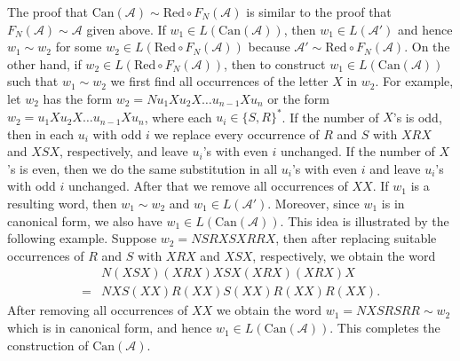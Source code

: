 \documentclass[fontsize=11pt,DIV=13,paper=letter]{scrartcl}
\theoremstyle{definition}
\newcommand{\A}{\mathcal{A}}
\begin{document}
The proof that $\mathrm{Can}(\A)\sim \mathrm{Red}\circ F_N(\A)$ is similar to the proof that $F_N(\A)\sim \A$ given above. If $w_1\in L(\mathrm{Can}(\A))$, then $w_1\in L(\A')$ and hence $w_1\sim w_2$ for some $w_2\in L(\mathrm{Red}\circ F_N(\A))$ because $\A'\sim \mathrm{Red}\circ F_N(\A)$. On the other hand, if $w_2\in L(\mathrm{Red}\circ F_N(\A))$, then to construct $w_1\in L(\mathrm{Can}(\A))$ such that $w_1\sim w_2$ we first find all occurrences of the letter $X$ in $w_2$. For example, let $w_2$ has the form $w_2=Nu_1Xu_2X\dots u_{n-1}Xu_n$ or the form $w_2=u_1Xu_2X\dots u_{n-1}Xu_n$, where each $u_i\in {\{S,R\}}^*$. If the number of $X$'s is odd, then in each $u_i$ with odd $i$ we replace every occurrence of $R$ and $S$ with $\mathit{XRX}$ and $\mathit{XSX}$, respectively, and leave $u_i$'s with even $i$ unchanged. If the number of $X$'s is even, then we do the same substitution in all $u_i$'s with even $i$ and leave $u_i$'s with odd $i$ unchanged. After that we remove all occurrences of $\mathit{XX}$. If $w_1$ is a resulting word, then $w_1\sim w_2$ and $w_1\in L(\A')$. Moreover, since $w_1$ is in canonical form, we also have $w_1\in L(\mathrm{Can}(\A))$. This idea is illustrated by the following example. Suppose $w_2=\mathit{NSRXSXRRX}$, then after replacing suitable occurrences of $R$ and $S$ with $\mathit{XRX}$ and $\mathit{XSX}$, respectively, we obtain the word
\[
\begin{split}
&N(\mathit{XSX})(\mathit{XRX})\mathit{XSX}(\mathit{XRX})(\mathit{XRX})X\\
= & \mathit{NXS}(\mathit{XX})R(\mathit{XX})S(\mathit{XX})R(\mathit{XX})R(\mathit{XX}).
\end{split}
\]
After removing all occurrences of $\mathit{XX}$ we obtain the word $w_1=\mathit{NXSRSRR}\sim w_2$ which is in canonical form, and hence $w_1\in L(\mathrm{Can}(\A))$. This completes the construction of $\mathrm{Can}(\A)$.





\end{document}
